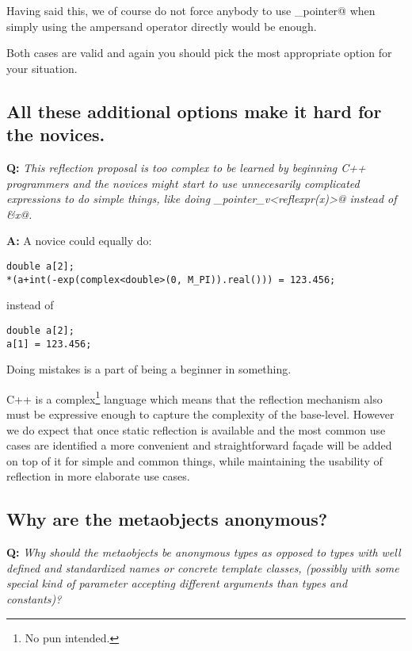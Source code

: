 Having said this, we of course do not force anybody to use \verb@get_pointer@
when simply using the ampersand operator directly would be enough.

Both cases are valid and again you should pick the most appropriate option
for your situation.

\subsection{All these additional options make it hard for the novices.}
\label{faq-hard-on-novices}

\textbf{Q:} {\em This reflection proposal is too complex to be learned by
beginning C++ programmers and the novices might start to use unnecesarily
complicated expressions to do simple things, like doing
\verb@get_pointer_v<reflexpr(x)>@ instead of \verb@&x@.}

\textbf{A:} 
A novice could equally do:

\begin{verbatim}
double a[2];
*(a+int(-exp(complex<double>(0, M_PI)).real())) = 123.456;
\end{verbatim}

instead of

\begin{verbatim}
double a[2];
a[1] = 123.456;
\end{verbatim}

Doing mistakes is a part of being a beginner in something.

C++ is a complex\footnote{No pun intended.} language which means that
the reflection mechanism also must be expressive enough to capture
the complexity of the base-level.
However we do expect that once static reflection is available and the most
common use cases are identified a more convenient and straightforward
fa\c{c}ade will be added on top of it for simple and common things,
while maintaining the usability of reflection in more elaborate use cases.

\subsection{Why are the metaobjects anonymous?}

\textbf{Q:} {\em Why should the metaobjects be anonymous types as opposed to
types with well defined and standardized names or concrete template classes, (possibly with some
special kind of parameter accepting different arguments than types and constants)?}

